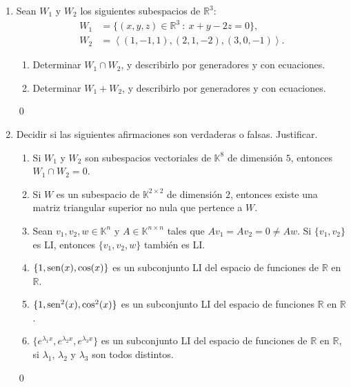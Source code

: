 \begin{enumerate}[resume, topsep=6pt, itemsep=.4cm]
    \item Sean $W_1$ y $W_2$ los siguientes subespacios de $\mathbb{R}^3$:
        \begin{align*}
        W_1 &= \{ (x,y,z)\in\mathbb{R}^3\ : \ x+y-2z=0\},  \\
        W_2 &= {\left\langle(1,-1,1),(2,1,-2),(3,0,-1)\right\rangle}.
        \end{align*}
        \begin{enumerate}
            \item  Determinar $W_1 \cap W_2$, y describirlo por generadores y con ecuaciones.
            \item  Determinar $W_1+W_2$, y describirlo por generadores y con ecuaciones.
        \end{enumerate}
    
    
    \rta 

    \qed     
        
    \item\label{verdadero o falso} Decidir si las siguientes afirmaciones son verdaderas o falsas. Justificar.
    
    \begin{enumerate}
    \item Si $W_1$ y $W_2$ son subespacios vectoriales de $\mathbb{K}^8$ de dimensión $5$, entonces $W_1\cap W_2=0$.
    \item Si $W$ es un subespacio de $\mathbb{K}^{2\times2}$ de dimensión $2$, entonces existe una matriz triangular superior no nula que pertence a $W$.
    \item Sean $v_1, v_2, w\in \mathbb{K}^{n}$ y $A\in\mathbb{K}^{n\times n}$ tales que $Av_1=Av_2=0\neq Aw$. Si $\{v_1, v_2\}$ es LI, entonces $\{v_1,v_2,w\}$ también es LI.
    \item\label{cos}  $\{1,{\rm sen}(x),\cos(x)\}$ es un subconjunto LI del espacio de funciones de $\mathbb{R}$ en $\mathbb{R}$.
    \item\label{cos2}  $\{1,{\rm sen}^2(x),\cos^2(x)\}$ es un subconjunto LI del espacio de funciones $\mathbb{R}$ en $\mathbb{R}$.
    \item\label{exponencial}  $\{e^{\lambda_1x},e^{\lambda_2x},e^{\lambda_3x}\}$ es un subconjunto LI del espacio de funciones de
    $\mathbb{R}$ en $\mathbb{R}$, si $\lambda_1$, $\lambda_2$ y $\lambda_3$ son todos distintos.
    \end{enumerate}
    
    
    \rta 

    \qed     
    
    
    
    
    \end{enumerate}
    
    